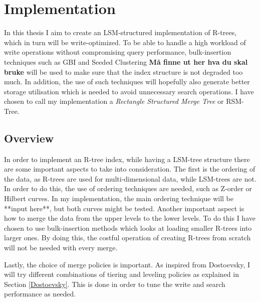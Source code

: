 \chapter{Implementation}

In this thesis I aim to create an LSM-structured implementation of R-trees, which in turn will be write-optimized. To be able to handle a high workload of write operations without compromising query performance, bulk-insertion techniques such as GBI\cite{GBI} and Seeded Clustering\cite{SeededClustering} \textbf{Må finne ut her hva du skal bruke} will be used to make sure that the index structure is not degraded too much. In addition, the use of such techniques will hopefully also generate better storage utilisation which is needed to avoid unnecessary search operations. I have chosen to call my implementation a \emph{Rectangle Structured Merge Tree} or RSM-Tree.

\section{Overview}
In order to implement an R-tree index, while having a LSM-tree structure there are some important aspects to take into consideration. The first is the ordering of the data, as R-trees are used for multi-dimensional data, while LSM-trees are not. In order to do this, the use of ordering techniques are needed, such as Z-order or Hilbert curves. In my implementation, the main ordering technique will be **input here**, but both curves might be tested. Another important aspect is how to merge the data from the upper levels to the lower levels. To do this I have chosen to use bulk-insertion methods which looks at loading smaller R-trees into larger ones. By doing this, the costful operation of creating R-trees from scratch will not be needed with every merge.\newline

Lastly, the choice of merge policies is important. As inspired from Dostoevsky\cite{Dostoevsky}, I will try different combinations of tiering and leveling policies as explained in Section \ref{Dostoevsky}. This is done in order to tune the write and search performance as needed.  

